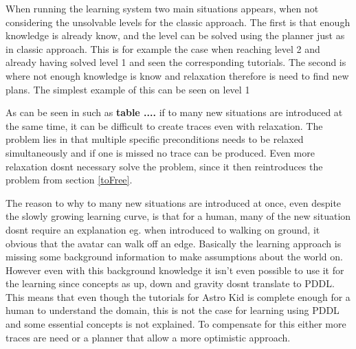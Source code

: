 	
	
	When running the learning system two main situations appears, when not considering the unsolvable levels for the classic approach. The first is that enough knowledge is already know, and the level can be solved using the planner just as in classic approach. This is for example the case when reaching level 2 and already having solved level 1 and seen the corresponding tutorials. The second is where not enough knowledge is know and relaxation therefore is need to find new plans. The simplest example of this can be seen on level 1
	
	
	As can be seen in such as \textbf{table ....} if to many new situations are introduced at the same time, it can be difficult to create traces even with relaxation. The problem lies in that multiple specific preconditions needs to be relaxed simultaneously and if one is missed no trace can be produced. Even more relaxation dosnt necessary solve the problem, since it then reintroduces the problem from section \ref{toFree}.
	
	The reason to why to many new situations are introduced at once, even despite the slowly growing learning curve, is that for a human, many of the new situation dosnt require an explanation eg. when introduced to walking on ground, it obvious that the avatar can walk off an edge. Basically the learning approach is missing some background information to make assumptions about the world on. However even with this background knowledge it isn't even possible to use it for the learning since concepts as up, down and gravity dosnt translate to PDDL. This means that even though the tutorials for Astro Kid is complete enough for a human to understand the domain, this is not the case for learning using PDDL and some essential concepts is not explained. To compensate for this either more traces are need or a planner that allow a more optimistic approach.
	
	

